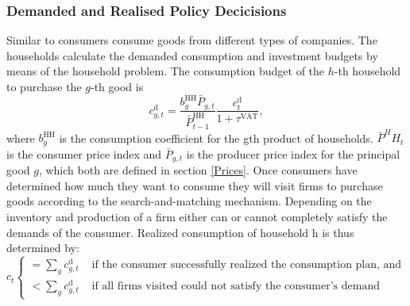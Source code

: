 \subsubsection{Demanded and Realised Policy Decicisions}
Similar to \cite{poledna_economic_2019} consumers consume goods from different types of companies. The households calculate the demanded consumption and investment budgets by means of the household problem. The consumption budget of the $h$-th household to purchase the $g$-th good is
\begin{equation}
c_{ g,t}^{\mathrm{d}}=\frac{b_g^{\mathrm{HH}} \bar{P}_{g,t} }{\bar{P}^{\mathrm{HH}}_{t-1} } \frac{c_t^{\mathrm{d}}}{1+\tau^{\text{VAT}}},
\end{equation}
where $b_g^{\mathrm{HH}}$ is the consumption coefficient for the gth product of households. $\bar{P}^HH_t$ is the consumer price index and $\bar{P}_{g,t}$ is the producer price index for the principal good $g$, which both are defined in section \ref{Prices}. Once consumers have determined how much they want to consume they will visit firms to purchase goods according to the search-and-matching mechanism. Depending on the inventory and production of a firm either can or cannot completely satisfy the demands of the consumer. Realized consumption of household h is thus determined by: 
\begin{equation}c_t \begin{cases}=\sum_g c_{g,t}^{\mathrm{d}}  & \text { if the consumer successfully realized the consumption plan, and } \\ <\sum_g c_{ g,t}^{\mathrm{d}}  & \text { if all firms visited could not satisfy the consumer's demand }\end{cases}\end{equation}
